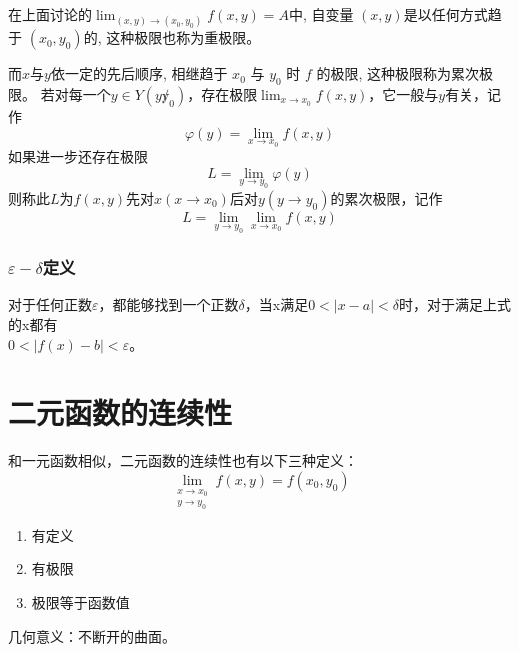 在上面讨论的$\lim_{(x,y)\to(x_0,y_0)}f(x,y)=A$中, 自变量 $(x, y)$是以任何方式趋于 $(x_0, y_0)$的, 这种极限也称为重极限。

而$x$与$y$依一定的先后顺序, 相继趋于 $x_0$ 与 $y_0$ 时 $f$ 的极限, 这种极限称为累次极限。
若对每一个$y\in Y(y\not y_0)$，存在极限$\lim_{x\to x_0}f(x,y)$，它一般与$y$有关，记作
$$\varphi(y)=\lim_{x\to x_0}f(x,y)$$
如果进一步还存在极限
$$L=\lim_{y\to y_0}\varphi(y)$$
则称此$L$为$f(x,y)$先对$x(x\to x_0)$后对$y(y\to y_0)$的累次极限，记作
$$L=\lim_{y\to y_0}\lim_{x\to x_0}f(x,y)$$


\subsubsection{$\varepsilon-\delta$定义}

对于任何正数$\varepsilon$，都能够找到一个正数$\delta$，当x满足${0<\mid x-a\mid <\delta }$时，对于满足上式的x都有\\ ${0<\mid f(x)-b\mid <\varepsilon }$。

\section{二元函数的连续性}

和一元函数相似，二元函数的连续性也有以下三种定义：
$$\lim_{ \substack{x\to x_0 \\ y\to y_0} }f(x,y)=f(x_0,y_0)$$%
\begin{enumerate}
    \item 有定义
    \item 有极限
    \item 极限等于函数值
\end{enumerate}
几何意义：不断开的曲面。